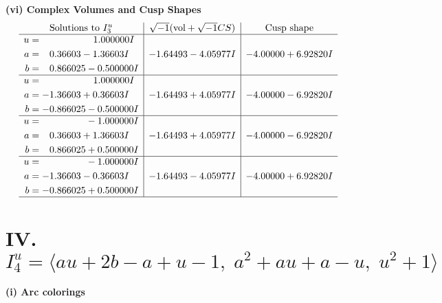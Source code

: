 \documentclass[1p]{elsarticle_modified}
\theoremstyle{definition}
\newcommand{\I}{\sqrt{-1}}
\begin{document}
\newpage\flushleft \textbf{(vi) Complex Volumes and Cusp Shapes}
$$\begin{array}{c|c|c}  
\text{Solutions to }I^u_{3}& \I (\text{vol} + \sqrt{-1}CS) & \text{Cusp shape}\\
 \hline 
\begin{aligned}
u &= \phantom{-0.000000 -}1.000000 I \\
a &= \phantom{-}0.36603 - 1.36603 I \\
b &= \phantom{-}0.866025 - 0.500000 I\end{aligned}
 & -1.64493 - 4.05977 I & -4.00000 + 6.92820 I \\ \hline\begin{aligned}
u &= \phantom{-0.000000 -}1.000000 I \\
a &= -1.36603 + 0.36603 I \\
b &= -0.866025 - 0.500000 I\end{aligned}
 & -1.64493 + 4.05977 I & -4.00000 - 6.92820 I \\ \hline\begin{aligned}
u &= \phantom{-0.000000 } -1.000000 I \\
a &= \phantom{-}0.36603 + 1.36603 I \\
b &= \phantom{-}0.866025 + 0.500000 I\end{aligned}
 & -1.64493 + 4.05977 I & -4.00000 - 6.92820 I \\ \hline\begin{aligned}
u &= \phantom{-0.000000 } -1.000000 I \\
a &= -1.36603 - 0.36603 I \\
b &= -0.866025 + 0.500000 I\end{aligned}
 & -1.64493 - 4.05977 I & -4.00000 + 6.92820 I\\
 \hline 
 \end{array}$$\newpage\newpage\renewcommand{\arraystretch}{1}
\centering \section*{IV. $I^u_{4}= \langle a u+2 b- a+u-1,\;a^2+a u+a- u,\;u^2+1 \rangle$}
\flushleft \textbf{(i) Arc colorings}\\
\end{document}
